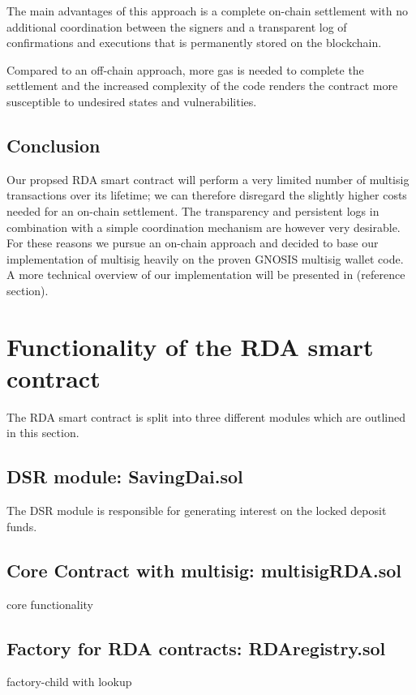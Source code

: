 \documentclass[12pt,a4paper,titlepage,oneside,english]{article}
\begin{document}
The main advantages of this approach is a complete on-chain settlement with no additional coordination between the signers and a transparent log of confirmations and executions that is permanently stored on the blockchain.

Compared to an off-chain approach, more gas is needed to complete the settlement and the increased complexity of the code renders the contract more susceptible to undesired states and vulnerabilities.

\subsection{Conclusion}
Our propsed RDA smart contract will perform a very limited number of multisig transactions over its lifetime; we can therefore disregard the slightly higher costs needed for an on-chain settlement. The transparency and persistent logs in combination with a simple coordination mechanism are however very desirable. For these reasons we pursue an on-chain approach and decided to base our implementation of multisig heavily on the proven GNOSIS multisig wallet code. A more technical overview of our implementation will be presented in (reference section).




\section{Functionality of the RDA smart contract}
The RDA smart contract is split into three different modules which are outlined in this section.
\subsection{DSR module: SavingDai.sol}
The DSR module is responsible for generating interest on the locked deposit funds.
\subsection{Core Contract with multisig: multisigRDA.sol}
core functionality
\subsection{Factory for RDA contracts: RDAregistry.sol}
factory-child with lookup


\end{document}
